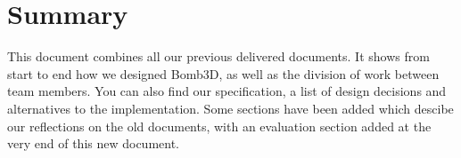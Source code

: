 \chapter{Summary} %
\label{cha:summary}

This document combines all our previous delivered documents. It shows from start to end how we designed Bomb3D, as well as the division of work between team members. You can also find our specification, a list of design decisions and alternatives to the implementation. Some sections have been added which descibe our reflections on the old documents, with an evaluation section added at the very end of this new document.



